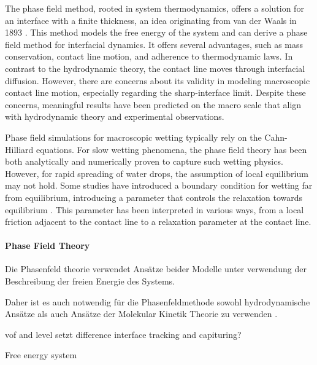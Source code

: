 The phase field method, rooted in system thermodynamics, offers a solution for an interface with a finite thickness, an idea originating from van der Waals in 1893 \cite{vanderwaals1979ThermodynamicTheoryCapillarity}. This method models the free energy of the system and can derive a phase field method for interfacial dynamics. It offers several advantages, such as mass conservation, contact line motion, and adherence to thermodynamic laws. In contrast to the hydrodynamic theory, the contact line moves through interfacial diffusion. However, there are concerns about its validity in modeling macroscopic contact line motion, especially regarding the sharp-interface limit. Despite these concerns, meaningful results have been predicted on the macro scale that align with hydrodynamic theory and experimental observations\cite{yue2010SharpinterfaceLimitCahn,yue2011CanDiffuseinterfaceModels,carlson2011DissipationRapidDynamic}.


Phase field simulations for macroscopic wetting typically rely on the Cahn-Hilliard equations. For slow wetting phenomena, the phase field theory has been both analytically \cite{jacqmin2000ContactlineDynamicsDiffuse} and numerically \cite{yue2011CanDiffuseinterfaceModels,yue2010SharpinterfaceLimitCahn} proven to capture such wetting physics. However, for rapid spreading of water drops, the assumption of local equilibrium may not hold. Some studies have introduced a boundary condition for wetting far from equilibrium, introducing a parameter that controls the relaxation towards equilibrium . This parameter has been interpreted in various ways, from a local friction adjacent to the contact line to a relaxation parameter at the contact line\cite{yue2011WallEnergyRelaxation}\cite{carlsonCapillarityDynamicWetting2012}.


\paragraph{Phase Field Theory}
Die Phasenfeld theorie verwendet Ansätze beider Modelle unter verwendung der Beschreibung der freien Energie des Systems.

Daher ist es auch notwendig für die Phasenfeldmethode sowohl hydrodynamische Ansätze als auch Ansätze der Molekular Kinetik Theorie zu verwenden \cite{blake2006PhysicsMovingWetting, carlsonCapillarityDynamicWetting2012}.

vof and level setzt
difference interface tracking and capituring? 

Free energy system 




